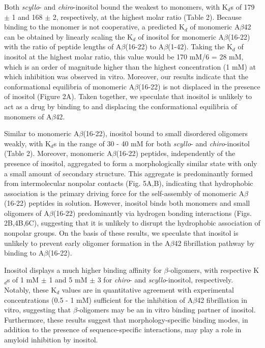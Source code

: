 Both \emph{scyllo}- and \emph{chiro}-inositol bound the weakest to monomers, with K$_d$s of 179 $\pm$ 1 and 168 $\pm$ 2, respectively, at the highest molar ratio (Table 2). Because binding to the monomer is not cooperative, a predicted K$_d$ of monomeric A$\beta$42 can be obtained by linearly scaling the K$_d$ of inositol for monomeric A$\beta$(16-22) with the ratio of peptide lengths of A$\beta$(16-22) to A$\beta$(1-42).  Taking the K$_{d}$ of inositol at the highest molar ratio, this value would be 170 mM/6 = 28 mM, which is an order of magnitude higher than the highest concentration (1 mM) at which inhibition was observed in vitro.\cite{McLaurin:2000p64}  Moreover, our results indicate that the conformational equilibria of monomeric A$\beta$(16-22) is not displaced in the presence of inositol (Figure 2A). Taken together, we speculate that inositol is unlikely to act as a drug by binding to and displacing the conformational equilibria of monomers of A$\beta$42.

Similar to monomeric A$\beta$(16-22), inositol bound to small disordered oligomers weakly, with K$_d$s in the range of 30 - 40 mM for both \emph{scyllo}- and \emph{chiro}-inositol (Table 2). Moreover, monomeric A$\beta$(16-22) peptides, independently of the presence of inositol, aggregated to form a morphologically similar state with only a small amount of secondary structure. This aggregate is predominantly formed from intermolecular nonpolar contacts (Fig. 5A,B), indicating that hydrophobic association is the primary driving force for the self-assembly of monomeric A$\beta$(16-22) peptides in solution. However, inositol binds both monomers and small oligomers of A$\beta$(16-22) predominantly via hydrogen bonding interactions (Figs. 2B,4B,6C), suggesting that it is unlikely to disrupt the hydrophobic association of nonpolar groups. On the basis of these results, we speculate that inositol is unlikely to prevent early oligomer formation in the A$\beta$42 fibrillation pathway by binding to A$\beta$(16-22).

Inositol displays a much higher binding affinity for $\beta$-oligomers, with respective K$_d$s of 1 mM $\pm$ 1 and 5 mM $\pm$ 3 for \emph{chiro}- and \emph{scyllo}-inositol, respectively. Notably, these K$_{d}$ values are in quantitative agreement with experimental concentrations (0.5 - 1 mM) sufficient for the inhibition of A$\beta$42 fibrillation in vitro,\cite{McLaurin:2000p64} suggesting that $\beta$-oligomers may be an in vitro binding partner of inositol. Furthermore, these results suggest that morphology-specific binding modes, in addition to the presence of sequence-specific interactions, may play a role in amyloid inhibition by inositol.

